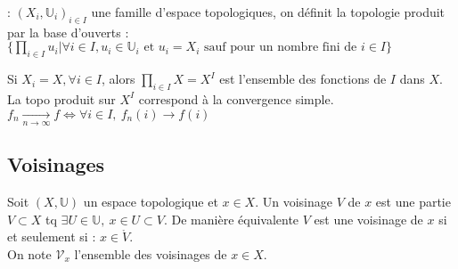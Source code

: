\begin{ex}: $(X_i,\mathbb{U}_i)_{i\in I}$ une famille d'espace topologiques, on définit la topologie produit par la base d'ouverts : \\
     $\{\prod\limits_{i\in I}u_i|\forall i\in I, u_i\in \mathbb{U}_i \text{ et }u_i=X_i \text{ sauf pour un nombre fini de } i\in I \}$
\end{ex}
\begin{ex}
    Si $X_i=X, \forall i\in I$, alors $\prod\limits_{i\in I}X=X^I$ est l'ensemble des fonctions de $I$ dans $X$. La topo produit sur $X^I$ correspond à la convergence simple. $f_n\underset{n\to \infty }{\longrightarrow} f\Leftrightarrow \forall i\in I,\ f_n(i)\to f(i)$
\end{ex}

\subsection{Voisinages}
\begin{definition}[Voisinage]
    Soit $(X,\mathbb{U})$ un espace topologique et $x\in X$. Un voisinage $V$ de $x$ est une partie $V\subset X$ tq $\exists U\in \mathbb{U},\ x\in U \subset V$. De manière équivalente $V$ est une voisinage de $x$ si et seulement si : $x \in \mathring{V}$.\\
     On note $\mathcal{V}_x$ l'ensemble des voisinages de $x\in X$.
\end{definition}

